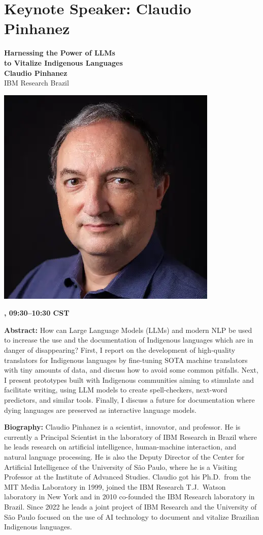 \newpage
\section{Keynote Speaker: Claudio Pinhanez}

\begin{center}
{\bfseries\Large Harnessing the Power of LLMs\\\vspace{2.0\lineskip}to Vitalize Indigenous Languages} \\
\vspace{1.0em}
{\large\bf Claudio Pinhanez} \\
IBM Research Brazil

\includegraphics[width=0.4\linewidth]{content/day1/claudio-headshot.png}

\textbf{\daydateyear{}, 09:30--10:30 CST}\\
\textbf{\PlenaryLoc{}}
\end{center}

\noindent
{\bfseries Abstract:} How can Large Language Models (LLMs) and modern NLP be used to increase the use and the documentation of Indigenous languages which are in danger of disappearing? First, I report on the development of high-quality translators for Indigenous languages by fine-tuning SOTA machine translators with tiny amounts of data, and discuss how to avoid some common pitfalls. Next, I present prototypes built with Indigenous communities aiming to stimulate and facilitate writing, using LLM models to create spell-checkers, next-word predictors, and similar tools. Finally, I discuss a future for documentation where dying languages are preserved as interactive language models.

\vspace{1em}

{\bfseries Biography:} 
Claudio Pinhanez is a scientist, innovator, and professor. He is currently a Principal Scientist in the laboratory of IBM Research in Brazil where he leads research on artificial intelligence, human-machine interaction, and natural language processing. He is also the Deputy Director of the Center for Artificial Intelligence of the University of S\~ao Paulo, where he is a Visiting Professor at the Institute of Advanced Studies. Claudio got his Ph.D.~from the MIT Media Laboratory in 1999, joined the IBM Research T.J.~Watson laboratory in New York and in 2010 co-founded the IBM Research laboratory in Brazil. Since 2022 he leads a joint project of IBM Research and the University of S\~ao Paulo focused on the use of AI technology to document and vitalize Brazilian Indigenous languages.

\newpage
